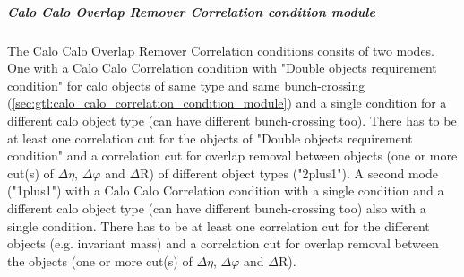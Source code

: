 

\subparagraph{Calo Calo Overlap Remover Correlation condition module}
\label{sec:gtl:calo_calo_overlap_remover_condition_module}

The Calo Calo Overlap Remover Correlation conditions consits of two modes. One with a Calo Calo Correlation condition with "Double objects requirement condition" for calo objects of same type and same bunch-crossing (\ref{sec:gtl:calo_calo_correlation_condition_module}) and a single condition for a different calo object type (can have different bunch-crossing too). There has to be at least one correlation cut for the objects of "Double objects requirement condition" and a correlation cut for overlap removal between objects (one or more cut(s) of $\Delta\eta$, $\Delta\varphi$ and $\Delta$R) of different object types ("2plus1"). A second mode ("1plus1") with a Calo Calo Correlation condition with a single condition and a different calo object type (can have different bunch-crossing too) also with a single condition. There has to be at least one correlation cut for the different objects (e.g. invariant mass) and a correlation cut for overlap removal between the objects (one or more cut(s) of $\Delta\eta$, $\Delta\varphi$ and $\Delta$R). 

